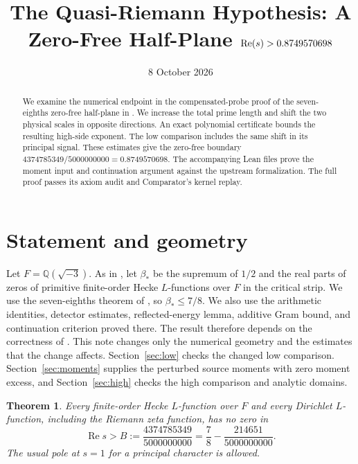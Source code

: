 \documentclass[11pt]{article}
\title{The Quasi-Riemann Hypothesis: A Zero-Free Half-Plane
$\Ree(s)>0.8749570698$}
\author{}
\date{8 October 2026}
\newtheorem{theorem}{Theorem}
\newcommand{\Ree}{\operatorname{Re}}
\begin{document}
\maketitle

\begin{abstract}
We examine the numerical endpoint in the compensated-probe proof of the
seven-eighths zero-free half-plane in \cite{OAI}. We increase the total
prime length and shift the two physical scales in opposite directions.
An exact polynomial certificate bounds the resulting high-side exponent.
The low comparison includes the same shift in its principal signal.
These estimates give the zero-free boundary
$4374785349/5000000000=0.8749570698$.
The accompanying Lean files prove the moment input and continuation
argument against the upstream formalization. The full proof passes its
axiom audit and Comparator's kernel replay.
\end{abstract}

\section{Statement and geometry}

Let $F=\mathbb Q(\sqrt{-3})$. As in \cite[Equation (1.1b)]{OAI}, let
$\beta_*$ be the supremum of $1/2$ and the real parts of zeros of primitive
finite-order Hecke $L$-functions over $F$ in the critical strip. We use the
seven-eighths theorem of \cite{OAI}, so $\beta_*\le 7/8$. We also use the
arithmetic identities, detector estimates, reflected-energy lemma, additive
Gram bound, and continuation criterion proved there. The result therefore
depends on the correctness of \cite{OAI}. This note changes only the
numerical geometry and the estimates that the change affects.
Section~\ref{sec:low} checks the changed low comparison.
Section~\ref{sec:moments} supplies the perturbed source moments with
zero moment excess, and Section~\ref{sec:high} checks the high comparison
and analytic domains.

\begin{theorem}\label{thm:main}
Every finite-order Hecke $L$-function over $F$ and every Dirichlet
$L$-function, including the Riemann zeta function, has no zero in
\[
    \Ree s> B:=\frac{4374785349}{5000000000}
                =\frac78-\frac{214651}{5000000000}.
\]
The usual pole at $s=1$ for a principal character is allowed.
\end{theorem}
\end{document}
